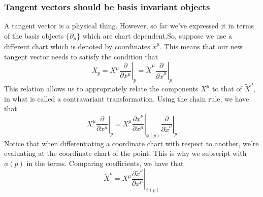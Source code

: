 \documentclass[11pt, a4paper]{article}   	%
\theoremstyle{slplain}
\begin{document}
\subsubsection*{Tangent vectors should be basis invariant objects} 
A tangent vector is a physical thing. However, so far we've expressed it in terms of the basis objects $ \{ \partial_\mu \} $ which are chart dependent.So, suppose we use a different chart which is denoted by coordinates $ \tilde{x}^\mu$. This means that our new tangent vector needs to satisfy the condition that 
\[ 
X_p = X^\mu \left.  \frac{ \partial}{ \partial x^\mu } \right\vert_{ p}   = \tilde{X}^\mu \left. \frac{ \partial }{ \partial \tilde{x}^\mu} \right\vert_p
\] 
This relation allows us to appropriately relate the components $X^\mu$ to that of $\tilde{X}^\mu$, in what is called a contravariant transformation. Using the chain rule, we have that 
\[ 
X^\mu \left. \frac{\partial}{ \partial x^\mu} \right\vert_p  = X^\mu \left. \frac{ \partial \tilde{ x}^\nu}{ \partial x^\mu} \right\vert_{ \phi(p )} \left. \frac{ \partial}{ \partial \tilde{x}^\nu } \right\vert_p 
\] Notice that when differentiating a coordinate chart with respect to another, we're evaluating at the coordinate chart of the point. This is why we subscript with $\phi( p)$ in the terms. Comparing coefficients, we have that 
\[ \tilde{X}^\nu = X^\mu \left. \frac{ \partial \tilde{x}^\nu }{ \partial x^\mu } \right\vert_{ \phi(p) } \] 
\end{document}
